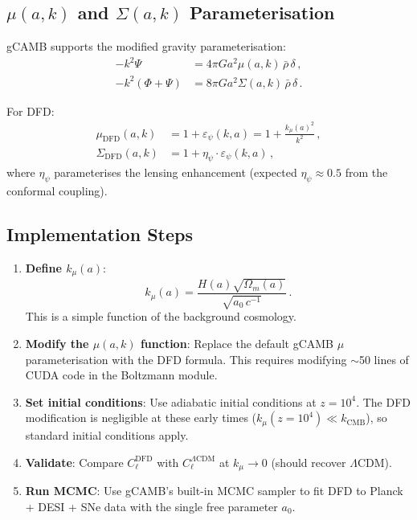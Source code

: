 \documentclass[11pt,a4paper]{article}
\begin{document}
\subsection{$\mu(a, k)$ and $\Sigma(a, k)$ Parameterisation}

gCAMB supports the modified gravity parameterisation:
\begin{align}
-k^2\Psi &= 4\pi G a^2 \mu(a, k)\,\bar{\rho}\,\delta\,, \\
-k^2(\Phi + \Psi) &= 8\pi G a^2 \Sigma(a, k)\,\bar{\rho}\,\delta\,.
\end{align}

For DFD:
\begin{align}
\mu_{\mathrm{DFD}}(a, k) &= 1 + \varepsilon_\psi(k, a) = 1 + \frac{k_\mu(a)^2}{k^2}\,, \\
\Sigma_{\mathrm{DFD}}(a, k) &= 1 + \eta_\psi \cdot \varepsilon_\psi(k, a)\,,
\end{align}
where $\eta_\psi$ parameterises the lensing enhancement (expected $\eta_\psi \approx 0.5$ from the conformal coupling).

\subsection{Implementation Steps}

\begin{enumerate}
\item \textbf{Define $k_\mu(a)$}:
\begin{equation}
k_\mu(a) = \frac{H(a)\sqrt{\Omega_m(a)}}{\sqrt{a_0\,c^{-1}}}\,.
\end{equation}
This is a simple function of the background cosmology.

\item \textbf{Modify the $\mu(a, k)$ function}: Replace the default gCAMB $\mu$ parameterisation with the DFD formula. This requires modifying $\sim$50 lines of CUDA code in the Boltzmann module.

\item \textbf{Set initial conditions}: Use adiabatic initial conditions at $z = 10^4$. The DFD modification is negligible at these early times ($k_\mu(z=10^4) \ll k_{\mathrm{CMB}}$), so standard initial conditions apply.

\item \textbf{Validate}: Compare $C_\ell^{\mathrm{DFD}}$ with $C_\ell^{\Lambda\mathrm{CDM}}$ at $k_\mu \to 0$ (should recover $\Lambda$CDM).

\item \textbf{Run MCMC}: Use gCAMB's built-in MCMC sampler to fit DFD to Planck + DESI + SNe data with the single free parameter $a_0$.
\end{enumerate}
\end{document}
